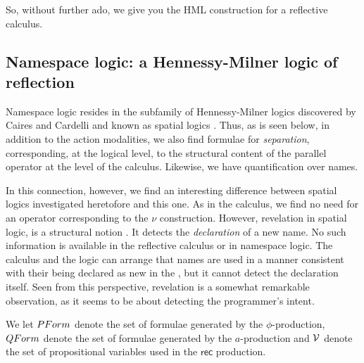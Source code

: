 So, without further ado, we give you the HML construction for a
reflective calculus.

\subsection{Namespace logic: a Hennessy-Milner logic of reflection}
Namespace logic resides in the subfamily of Hennessy-Milner logics
discovered by Caires and Cardelli and known as spatial logics
\cite{DBLP:journals/tcs/CairesC04}. Thus, as is seen below, in
addition to the action modalities, we also find formulae for
\emph{separation}, corresponding, at the logical level, to the
structural content of the parallel operator at the level of the
calculus. Likewise, we have quantification over names. 

In this connection, however, we find an interesting difference between
spatial logics investigated heretofore and this one. As in the
calculus, we find no need for an operator corresponding to the $\nu$
construction. However, revelation in spatial logic, is a structural
notion \cite{DBLP:journals/tcs/CairesC04}. It detects the
\emph{declaration} of a new name. No such information is available in
the reflective calculus or in namespace logic. The calculus and the
logic can arrange that names are used in a manner consistent with
their being declared as new in the {\pic}, but it cannot detect the
declaration itself. Seen from this perspective, revelation is a
somewhat remarkable observation, as it seems to be about detecting the
programmer's intent.


We let $\mathbin{PForm}$ denote the set of formulae generated by the
$\phi$-production, $\mathbin{QForm}$ denote the set of formulae generated by
the $a$-production and $\mathbin{\mathcal{V}}$ denote the set of propositional
variables used in the $\textsf{rec}$ production.

